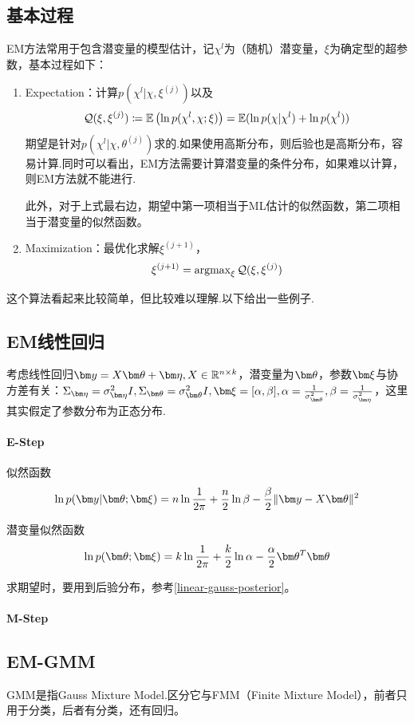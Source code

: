 \subsection{基本过程}
EM方法常用于包含潜变量的模型估计，记$\chi^l$为（随机）潜变量，$\xi$为确定型的超参数，基本过程如下：
\begin{enumerate}
\item Expectation：计算$p(\chi^l|\chi,\xi^{(j)})$以及
$$\mathcal{Q}(\xi,\xi^{(j)})\coloneqq \operatorname{\mathbb{E}}\left(\ln p(\chi^l,\chi;\xi)\right)=\operatorname{\mathbb{E}}(\ln p(\chi|\chi^l)+\ln p(\chi^l))$$
期望是针对$p(\chi^l|\chi,\theta^{(j)})$求的.如果使用高斯分布，则后验也是高斯分布，容易计算.同时可以看出，EM方法需要计算潜变量的条件分布，如果难以计算，则EM方法就不能进行.

此外，对于上式最右边，期望中第一项相当于ML估计的似然函数，第二项相当于潜变量的似然函数。

\item Maximization：最优化求解$\xi^{(j+1)}$，
$$\xi^{(j+1)}=\operatorname{argmax}_{\xi} \mathcal{Q}(\xi,\xi^{(j)})$$
\end{enumerate}

这个算法看起来比较简单，但比较难以理解.以下给出一些例子.

\subsection{EM线性回归}
考虑线性回归$\by=X\btheta+\bmeta,X\in \mathbb{R}^{n\times k}$，潜变量为$\btheta$，参数$\bxi$与协方差有关：$\Sigma_{\bmeta}=\sigma_{\bmeta}^2I,\Sigma_{\btheta}=\sigma_{\btheta}^2I,\bxi=[\alpha,\beta],\alpha=\frac{1}{\sigma_{\btheta}^2},\beta=\frac{1}{\sigma_{\bmeta}^2}$，这里其实假定了参数分布为正态分布.

\paragraph*{E-Step}似然函数
$$\ln p(\by|\btheta;\bxi)=n\ln \frac{1}{2\pi}+\frac{n}{2}\ln\beta-\frac{\beta}{2}\|\by-X\btheta\|^2$$

潜变量似然函数
$$\ln p(\btheta;\bxi)=k\ln \frac{1}{2\pi}+\frac{k}{2}\ln\alpha-\frac{\alpha}{2}\btheta^T\btheta$$

求期望时，要用到后验分布，参考\eqref{linear-gauss-posterior}。


\paragraph*{M-Step}

\subsection{EM-GMM}
GMM是指Gauss Mixture Model.区分它与FMM（Finite Mixture Model），前者只用于分类，后者有分类，还有回归。

